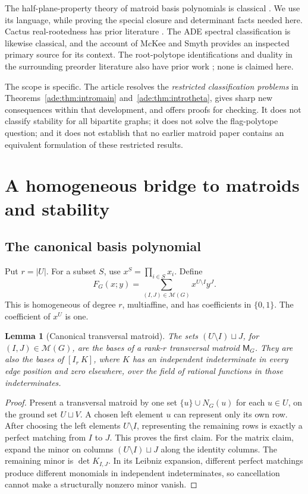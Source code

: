 \documentclass[11pt]{article}
\numberwithin{equation}{section}
\newtheorem{lemma}[theorem]{Lemma}
\theoremstyle{definition}
\newcommand{\PM}{\mathcal M}
\begin{document}
The half-plane-property theory of matroid basis polynomials is classical
\cite{COSW,Branden}.  We use its language, while proving the special
closure and determinant facts needed here.  Cactus real-rootedness has
prior literature \cite{OT21}.  The ADE spectral classification is likewise
classical, and the account of McKee and Smyth \cite{McKeeSmyth} provides
an inspected primary source for its context.  The root-polytope
identifications and duality in the surrounding preorder literature also
have prior work \cite{DHLTW}; none is claimed here.

The scope is specific.  The article resolves the
\emph{restricted classification problems} in
Theorems~\ref{ade:thm:intromain} and~\ref{ade:thm:introtheta}, gives sharp new
consequences within that development, and offers proofs for checking.  It
does not classify stability for all bipartite graphs; it does not solve the
flag-polytope question; and it does not establish that no earlier matroid
paper contains an equivalent formulation of these restricted results.

\section{A homogeneous bridge to matroids and stability}
\label{ade:sec:bridge}

\subsection{The canonical basis polynomial}

Put $r=|U|$.  For a subset $S$, use $x^S=\prod_{i\in S}x_i$.
Define
\begin{equation}
 F_G(x;y)=\sum_{(I,J)\in\PM(G)}x^{U\setminus I}y^J.
 \label{ade:eq:Fdef}
\end{equation}
This is homogeneous of degree $r$, multiaffine, and has coefficients in
$\{0,1\}$.  The coefficient of $x^U$ is one.

\begin{lemma}[Canonical transversal matroid]
\label{ade:lem:matroid}
The sets $(U\setminus I)\sqcup J$, for $(I,J)\in\PM(G)$, are the
bases of a rank-$r$ transversal matroid $\mathsf M_G$.  They are also the bases of
$[I_r\ K]$, where $K$ has an independent indeterminate in every edge
position and zero elsewhere, over the field of rational functions in
those indeterminates.
\end{lemma}
\begin{proof}
Present a transversal matroid by one set
$\{u\}\cup N_G(u)$ for each $u\in U$, on the ground set $U\sqcup V$.
A chosen left element $u$ can represent only its own row.  After choosing
the left elements $U\setminus I$, representing the remaining rows is
exactly a perfect matching from $I$ to $J$.  This proves the first claim.
For the matrix claim, expand the minor on columns
$(U\setminus I)\sqcup J$ along the identity columns.  The remaining minor
is $\det K_{I,J}$.  In its Leibniz expansion, different perfect matchings
produce different monomials in independent indeterminates, so cancellation
cannot make a structurally nonzero minor vanish.
\end{proof}
\end{document}
